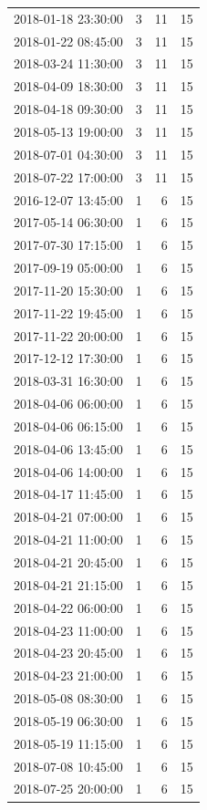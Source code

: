 \begin{tabular}{lrrr}
2018-01-18 23:30:00 & 3 & 11 & 15 \\
2018-01-22 08:45:00 & 3 & 11 & 15 \\
2018-03-24 11:30:00 & 3 & 11 & 15 \\
2018-04-09 18:30:00 & 3 & 11 & 15 \\
2018-04-18 09:30:00 & 3 & 11 & 15 \\
2018-05-13 19:00:00 & 3 & 11 & 15 \\
2018-07-01 04:30:00 & 3 & 11 & 15 \\
2018-07-22 17:00:00 & 3 & 11 & 15 \\
2016-12-07 13:45:00 & 1 & 6 & 15 \\
2017-05-14 06:30:00 & 1 & 6 & 15 \\
2017-07-30 17:15:00 & 1 & 6 & 15 \\
2017-09-19 05:00:00 & 1 & 6 & 15 \\
2017-11-20 15:30:00 & 1 & 6 & 15 \\
2017-11-22 19:45:00 & 1 & 6 & 15 \\
2017-11-22 20:00:00 & 1 & 6 & 15 \\
2017-12-12 17:30:00 & 1 & 6 & 15 \\
2018-03-31 16:30:00 & 1 & 6 & 15 \\
2018-04-06 06:00:00 & 1 & 6 & 15 \\
2018-04-06 06:15:00 & 1 & 6 & 15 \\
2018-04-06 13:45:00 & 1 & 6 & 15 \\
2018-04-06 14:00:00 & 1 & 6 & 15 \\
2018-04-17 11:45:00 & 1 & 6 & 15 \\
2018-04-21 07:00:00 & 1 & 6 & 15 \\
2018-04-21 11:00:00 & 1 & 6 & 15 \\
2018-04-21 20:45:00 & 1 & 6 & 15 \\
2018-04-21 21:15:00 & 1 & 6 & 15 \\
2018-04-22 06:00:00 & 1 & 6 & 15 \\
2018-04-23 11:00:00 & 1 & 6 & 15 \\
2018-04-23 20:45:00 & 1 & 6 & 15 \\
2018-04-23 21:00:00 & 1 & 6 & 15 \\
2018-05-08 08:30:00 & 1 & 6 & 15 \\
2018-05-19 06:30:00 & 1 & 6 & 15 \\
2018-05-19 11:15:00 & 1 & 6 & 15 \\
2018-07-08 10:45:00 & 1 & 6 & 15 \\
2018-07-25 20:00:00 & 1 & 6 & 15 \\

\end{tabular}
